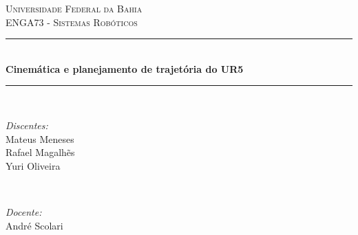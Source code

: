 \begin{titlepage}

\newcommand{\HRule}{\rule{\linewidth}{0.5mm}} %

\center %
 

\textsc{\LARGE Universidade Federal da Bahia}\\[1.5cm] 
\textsc{\Large ENGA73 - Sistemas Robóticos}\\[0.5cm] 


\HRule \\[0.4cm]
{ \huge \bfseries Cinemática e planejamento de trajetória do UR5}\\[0.4cm] %
\HRule \\[1.5cm]
 

\begin{minipage}{0.4\textwidth}
\begin{flushleft} \large
\emph{Discentes:} \\
{\normalsize
\hspace{1em} Mateus Meneses \\
\hspace{1em} Rafael Magalhẽs \\
\hspace{1em} Yuri Oliveira}
\end{flushleft}
\end{minipage}
~
\begin{minipage}{0.4\textwidth}
\begin{flushright} \large
\emph{Docente:} \\
André Scolari
\end{flushright}
\end{minipage}\\[2cm]


\end{titlepage}

